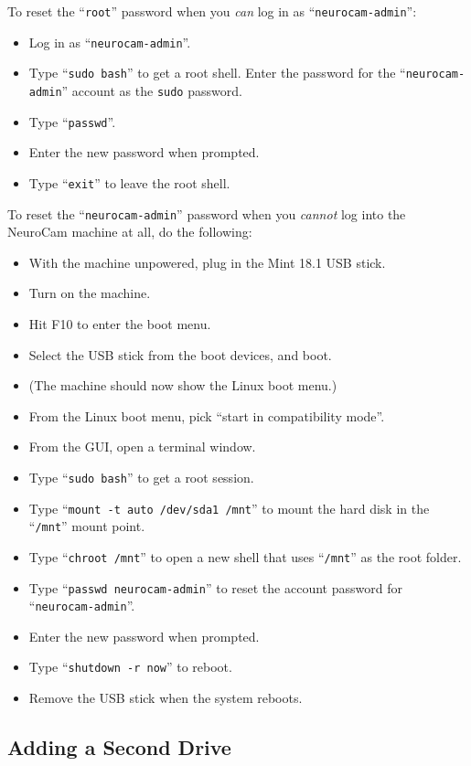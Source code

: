 To reset the ``\verb+root+'' password when you \textit{can} log in as
``\verb+neurocam-admin+'':
\begin{itemize}
\item Log in as ``\verb+neurocam-admin+''.
\item Type ``\verb+sudo bash+'' to get a root shell. Enter the password
for the ``\verb+neurocam-admin+'' account as the \verb+sudo+ password.
\item Type ``\verb+passwd+''.
\item Enter the new password when prompted.
\item Type ``\verb+exit+'' to leave the root shell.
\end{itemize}

To reset the ``\verb+neurocam-admin+'' password when you \textit{cannot}
log into the NeuroCam machine at all, do the following:
\begin{itemize}
\item With the machine unpowered, plug in the Mint 18.1 USB stick.
\item Turn on the machine.
\item Hit F10 to enter the boot menu.
\item Select the USB stick from the boot devices, and boot.
\item (The machine should now show the Linux boot menu.)
\item From the Linux boot menu, pick ``start in compatibility mode''.
\item From the GUI, open a terminal window.
\item Type ``\verb+sudo bash+'' to get a root session.
\item Type ``\verb+mount -t auto /dev/sda1 /mnt+'' to mount the hard disk
in the ``\verb+/mnt+'' mount point.
\item Type ``\verb+chroot /mnt+'' to open a new shell that uses
``\verb+/mnt+'' as the root folder.
\item Type ``\verb+passwd neurocam-admin+'' to reset the account password
for ``\verb+neurocam-admin+''.
\item Enter the new password when prompted.
\item Type ``\verb+shutdown -r now+'' to reboot.
\item Remove the USB stick when the system reboots.
\end{itemize}

%
\subsection{Adding a Second Drive}

